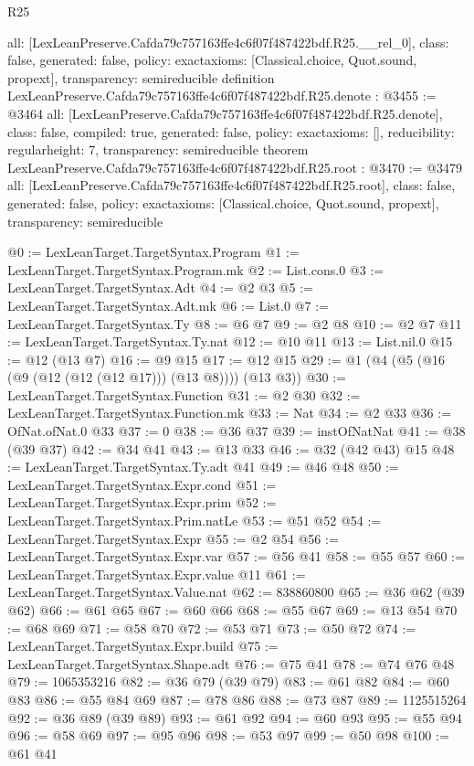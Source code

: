 \begin{lexlean}{R25}
\begin{coremodule}
{  all: [LexLeanPreserve.Cafda79c757163ffe4c6f07f487422bdf.R25.__rel_0],
  class: false,
  generated: false,
  policy: exact{axioms: [Classical.choice, Quot.sound, propext]},
  transparency: semireducible
}
definition LexLeanPreserve.Cafda79c757163ffe4c6f07f487422bdf.R25.denote : @3455 := @3464 {
  all: [LexLeanPreserve.Cafda79c757163ffe4c6f07f487422bdf.R25.denote],
  class: false,
  compiled: true,
  generated: false,
  policy: exact{axioms: []},
  reducibility: regular{height: 7},
  transparency: semireducible
}
theorem LexLeanPreserve.Cafda79c757163ffe4c6f07f487422bdf.R25.root : @3470 := @3479 {
  all: [LexLeanPreserve.Cafda79c757163ffe4c6f07f487422bdf.R25.root],
  class: false,
  generated: false,
  policy: exact{axioms: [Classical.choice, Quot.sound, propext]},
  transparency: semireducible
}

@0 := LexLeanTarget.TargetSyntax.Program
@1 := LexLeanTarget.TargetSyntax.Program.mk
@2 := List.cons.{0}
@3 := LexLeanTarget.TargetSyntax.Adt
@4 := @2 @3
@5 := LexLeanTarget.TargetSyntax.Adt.mk
@6 := List.{0}
@7 := LexLeanTarget.TargetSyntax.Ty
@8 := @6 @7
@9 := @2 @8
@10 := @2 @7
@11 := LexLeanTarget.TargetSyntax.Ty.nat
@12 := @10 @11
@13 := List.nil.{0}
@15 := @12 (@13 @7)
@16 := @9 @15
@17 := @12 @15
@29 := @1 (@4 (@5 (@16 (@9 (@12 (@12 (@12 @17))) (@13 @8)))) (@13 @3))
@30 := LexLeanTarget.TargetSyntax.Function
@31 := @2 @30
@32 := LexLeanTarget.TargetSyntax.Function.mk
@33 := Nat
@34 := @2 @33
@36 := OfNat.ofNat.{0} @33
@37 := 0
@38 := @36 @37
@39 := instOfNatNat
@41 := @38 (@39 @37)
@42 := @34 @41
@43 := @13 @33
@46 := @32 (@42 @43) @15
@48 := LexLeanTarget.TargetSyntax.Ty.adt @41
@49 := @46 @48
@50 := LexLeanTarget.TargetSyntax.Expr.cond
@51 := LexLeanTarget.TargetSyntax.Expr.prim
@52 := LexLeanTarget.TargetSyntax.Prim.natLe
@53 := @51 @52
@54 := LexLeanTarget.TargetSyntax.Expr
@55 := @2 @54
@56 := LexLeanTarget.TargetSyntax.Expr.var
@57 := @56 @41
@58 := @55 @57
@60 := LexLeanTarget.TargetSyntax.Expr.value @11
@61 := LexLeanTarget.TargetSyntax.Value.nat
@62 := 838860800
@65 := @36 @62 (@39 @62)
@66 := @61 @65
@67 := @60 @66
@68 := @55 @67
@69 := @13 @54
@70 := @68 @69
@71 := @58 @70
@72 := @53 @71
@73 := @50 @72
@74 := LexLeanTarget.TargetSyntax.Expr.build
@75 := LexLeanTarget.TargetSyntax.Shape.adt
@76 := @75 @41
@78 := @74 @76 @48
@79 := 1065353216
@82 := @36 @79 (@39 @79)
@83 := @61 @82
@84 := @60 @83
@86 := @55 @84 @69
@87 := @78 @86
@88 := @73 @87
@89 := 1125515264
@92 := @36 @89 (@39 @89)
@93 := @61 @92
@94 := @60 @93
@95 := @55 @94
@96 := @58 @69
@97 := @95 @96
@98 := @53 @97
@99 := @50 @98
@100 := @61 @41

\end{coremodule}
\end{lexlean}
